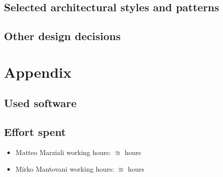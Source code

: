 \documentclass{article}
\begin{document}
\subsection{Selected architectural styles and patterns}\label{archstyles}

\subsection{Other design decisions}\label{otherdecisions}




\clearpage
\section{Appendix}

\subsection{Used software}


\subsection{Effort spent}
\begin{itemize}

\item Matteo Marziali working hours:  $\approxeq$ hours

\item Mirko Mantovani working hours:  $\approxeq$ hours



\end{itemize}
\end{document}
